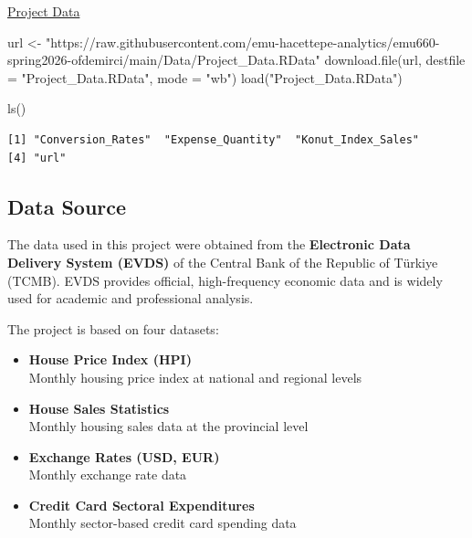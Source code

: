 \documentclass[
  11pt,
  a4paper,
]{article}
\newenvironment{Shaded}{\begin{snugshade}}{\end{snugshade}}
\newcommand{\AttributeTok}[1]{\textcolor[rgb]{0.40,0.45,0.13}{#1}}
\newcommand{\FunctionTok}[1]{\textcolor[rgb]{0.28,0.35,0.67}{#1}}
\newcommand{\NormalTok}[1]{\textcolor[rgb]{0.00,0.23,0.31}{#1}}
\newcommand{\OtherTok}[1]{\textcolor[rgb]{0.00,0.23,0.31}{#1}}
\newcommand{\StringTok}[1]{\textcolor[rgb]{0.13,0.47,0.30}{#1}}
\begin{document}
\href{https://github.com/emu-hacettepe-analytics/emu660-spring2026-ofdemirci/blob/e273d93492dc0a2ea56f85a472a398fe4909c2d7/Data/Project_Data.RData}{Project
Data}

\begin{Shaded}
\begin{Highlighting}[]
\NormalTok{url }\OtherTok{\textless{}{-}} \StringTok{"https://raw.githubusercontent.com/emu{-}hacettepe{-}analytics/emu660{-}spring2026{-}ofdemirci/main/Data/Project\_Data.RData"}
\FunctionTok{download.file}\NormalTok{(url, }\AttributeTok{destfile =} \StringTok{"Project\_Data.RData"}\NormalTok{, }\AttributeTok{mode =} \StringTok{"wb"}\NormalTok{)}
\FunctionTok{load}\NormalTok{(}\StringTok{"Project\_Data.RData"}\NormalTok{)}

\FunctionTok{ls}\NormalTok{()}
\end{Highlighting}
\end{Shaded}

\begin{verbatim}
[1] "Conversion_Rates"  "Expense_Quantity"  "Konut_Index_Sales"
[4] "url"              
\end{verbatim}

\subsection{Data Source}\label{data-source}

The data used in this project were obtained from the \textbf{Electronic
Data Delivery System (EVDS)} of the Central Bank of the Republic of
Türkiye (TCMB). EVDS provides official, high-frequency economic data and
is widely used for academic and professional analysis.

The project is based on four datasets:

\begin{itemize}
\item
  \textbf{House Price Index (HPI)}\\
  Monthly housing price index at national and regional levels
\item
  \textbf{House Sales Statistics}\\
  Monthly housing sales data at the provincial level
\item
  \textbf{Exchange Rates (USD, EUR)}\\
  Monthly exchange rate data
\item
  \textbf{Credit Card Sectoral Expenditures}\\
  Monthly sector-based credit card spending data
\end{itemize}
\end{document}
